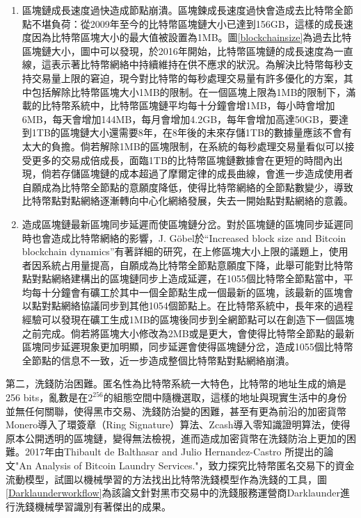 					\begin{enumerate}
						\item 區塊鏈成⾧速度過快造成節點崩潰。區塊鍊成長速度過快會造成去比特幣全節點不堪負荷：從2009年至今的比特幣區塊鏈大小已達到156GB，這樣的成長速度因為比特幣區塊大小的最大值被設置為1MB。圖\ref{blockchainsize}為過去比特區塊鏈大小，圖中可以發現，於2016年開始，比特幣區塊鏈的成長速度為一直線，這表示著比特幣網絡中持續維持在供不應求的狀況。為解決比特幣每秒⽀持交易量上限的窘迫，現今對⽐特幣的每秒處理交易量有許多優化的⽅案，其中包括解除比特幣區塊大小1MB的限制。在一個區塊上限為1MB的限制下，滿載的比特幣系統中，比特幣區塊鏈平均每十分鐘會增1MB，每小時會增加6MB，每天會增加144MB，每月會增加4.2GB，每年會增加高達50GB，要達到1TB的區塊鏈大小還需要8年，在8年後的未來存儲1TB的數據量應該不會有太大的負擔。倘若解除1MB的區塊限制，在系統的每秒處理交易量看似可以接受更多的交易成倍成長，面臨1TB的比特幣區塊鏈數據會在更短的時間內出現，倘若存儲區塊鏈的成本超過了摩爾定律的成長曲線，會進一步造成使用者自願成為比特幣全節點的意願度降低，使得比特幣網絡的全節點數變少，導致比特幣點對點網絡逐漸轉向中心化網絡發展，失去一開始點對點網絡的意義。

						\item 造成區塊鏈最新區塊同步延遲而使區塊鏈分岔。對於區塊鏈的區塊同步延遲同時也會造成比特幣網絡的影響，J. Göbel於“Increased block size and Bitcoin blockchain dynamics”\supercite{TelecommunicationNetworksandApplicationsConferenceITNAC201727thInternational}有著詳細的研究，在上修區塊大小上限的議題上，使用者因系統占用量提高，⾃願成為⽐特幣全節點意願度下降，此舉可能對⽐特幣點對點網絡建構出的區塊鏈同步上造成延遲，在1055個比特幣全節點當中，平均每十分鐘會有礦工於其中一個全節點生成一個最新的區塊，該最新的區塊會以點對點網絡協議同步到其他1054個節點上。在比特幣系統中，長年來的過程經驗可以發現在礦工生成1MB的區塊後同步到全網節點可以在創造下一個區塊之前完成。倘若將區塊大小修改為2MB或是更大，會使得比特幣全節點的最新區塊同步延遲現象更加明顯，同步延遲會使得區塊鏈分岔，造成1055個比特幣全節點的信息不一致，近一步造成整個比特幣點對點網絡崩潰。
					\end{enumerate}
					

				第二，洗錢防治困難。匿名性為比特幣系統一大特色，比特幣的地址生成的熵是256 bits，亂數是在$2^{256}$的組態空間中隨機選取，這樣的地址與現實生活中的身份並無任何關聯，使得黑市交易、洗錢防治變的困難，甚至有更為前沿的加密貨幣Monero\supercite{noether2014monero}導入了環簽章（Ring Signature）\supercite{Thresholdringsignaturesandapplicationstoad-hocgroups}算法、Zcash\supercite{zhong2002faster}導入零知識證明算法\supercite{Zero-KnowledgeProofsofIdentity}，使得原本公開透明的區塊鏈，變得無法檢視，進而造成加密貨幣在洗錢防治上更加的困難。2017年由Thibault de Balthasar and Julio Hernandez-Castro 所提出的論文"An Analysis of Bitcoin Laundry Services."\supercite{AnAnalysisofBitcoinLaundryServices}，致⼒探究⽐特幣匿名交易下的資⾦流動模型，試圖以機械學習的方法找出比特幣洗錢模型作為洗錢的工具，圖\ref{Darklaunderworkflow}為該論文針對黑市交易中的洗錢服務運營商Darklaunder進行洗錢機械學習識別有著傑出的成果。


